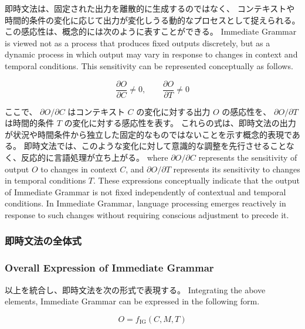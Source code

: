 \documentclass[a4paper]{article}
\begin{document}
\ifJPN
即時文法は、固定された出力を離散的に生成するのではなく、
コンテキストや時間的条件の変化に応じて出力が変化しうる動的なプロセスとして捉えられる。
この感応性は、概念的には次のように表すことができる。
\else
Immediate Grammar is viewed not as a process that produces fixed outputs discretely,
but as a dynamic process in which output may vary in response to changes in context
and temporal conditions.
This sensitivity can be represented conceptually as follows.
\fi

\[
\frac{\partial O}{\partial C} \neq 0,
\qquad
\frac{\partial O}{\partial T} \neq 0
\]

\ifJPN
ここで、
\(\partial O/\partial C\) はコンテキスト \(C\) の変化に対する出力 \(O\) の感応性を、
\(\partial O/\partial T\) は時間的条件 \(T\) の変化に対する感応性を表す。
これらの式は、即時文法の出力が状況や時間条件から独立した固定的なものではないことを示す概念的表現である。
即時文法では、このような変化に対して意識的な調整を先行させることなく、反応的に言語処理が立ち上がる。
\else
where \(\partial O/\partial C\) represents the sensitivity of output \(O\)
to changes in context \(C\), and \(\partial O/\partial T\) represents
its sensitivity to changes in temporal conditions \(T\).
These expressions conceptually indicate that the output of Immediate Grammar
is not fixed independently of contextual and temporal conditions.
In Immediate Grammar, language processing emerges reactively in response to such changes
without requiring conscious adjustment to precede it.
\fi

\ifJPN
\subsubsection{即時文法の全体式}
\else
\subsubsection{Overall Expression of Immediate Grammar}
\fi

\ifJPN
以上を統合し、即時文法を次の形式で表現する。
\else
Integrating the above elements, Immediate Grammar can be expressed in the following form.
\fi

\[
O = f_{\text{IG}}(C, M, T)
\]
\end{document}
